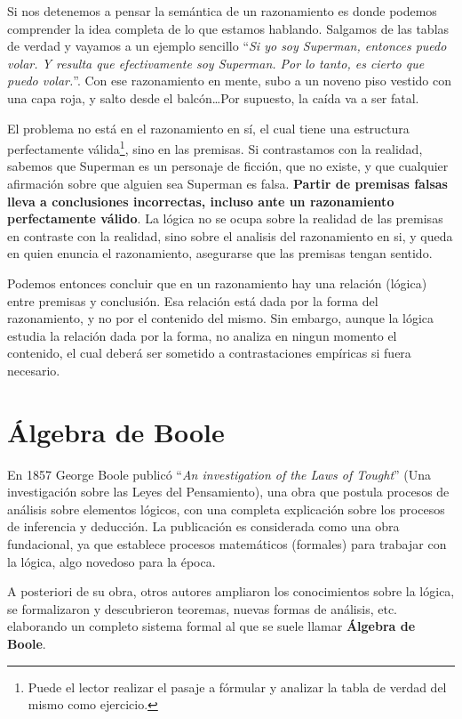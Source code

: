 Si nos detenemos a pensar la semántica de un razonamiento es donde podemos
comprender la idea completa de lo que estamos hablando. Salgamos de las tablas
de verdad y vayamos a un ejemplo sencillo ``\textit{Si yo soy Superman, entonces
puedo volar. Y resulta que efectivamente soy Superman. Por lo tanto, es cierto
que puedo volar.}''. Con ese razonamiento en mente, subo a un noveno piso
vestido con una capa roja, y salto desde el balcón\ldots Por supuesto, la caída
va a ser fatal.

El problema no está en el razonamiento en sí, el cual tiene una estructura
perfectamente válida\footnote{Puede el lector realizar el pasaje a fórmular y
analizar la tabla de verdad del mismo como ejercicio.}, sino en las premisas. Si
contrastamos con la realidad, sabemos que Superman es un personaje de ficción,
que no existe, y que cualquier afirmación sobre que alguien sea Superman es
falsa. \textbf{Partir de premisas falsas lleva a conclusiones incorrectas,
incluso ante un razonamiento perfectamente válido}. La lógica no se ocupa sobre
la realidad de las premisas en contraste con la realidad, sino sobre el analisis
del razonamiento en si, y queda en quien enuncia el razonamiento, asegurarse que
las premisas tengan sentido.

Podemos entonces concluir que en un razonamiento hay una relación (lógica) entre
premisas y conclusión. Esa relación está dada por la forma del razonamiento, y
no por el contenido del mismo. Sin embargo, aunque la lógica estudia la relación
dada por la forma, no analiza en ningun momento el contenido, el cual deberá ser
sometido a contrastaciones empíricas si fuera necesario.

\section{Álgebra de Boole}
\label{chap:logica_proposicional:sec:algebra_boole}

En 1857 George Boole publicó ``\textit{An investigation of the Laws of Tought}''
(Una investigación sobre las Leyes del Pensamiento), una obra que postula
procesos de análisis sobre elementos lógicos, con una completa explicación sobre
los procesos de inferencia y deducción. La publicación es considerada como una
obra fundacional, ya que establece procesos matemáticos (formales) para trabajar
con la lógica, algo novedoso para la época.

A posteriori de su obra, otros autores ampliaron los conocimientos sobre la
lógica, se formalizaron y descubrieron teoremas, nuevas formas de análisis, etc.
elaborando un completo sistema formal al que se suele llamar \textbf{Álgebra de
Boole}.

